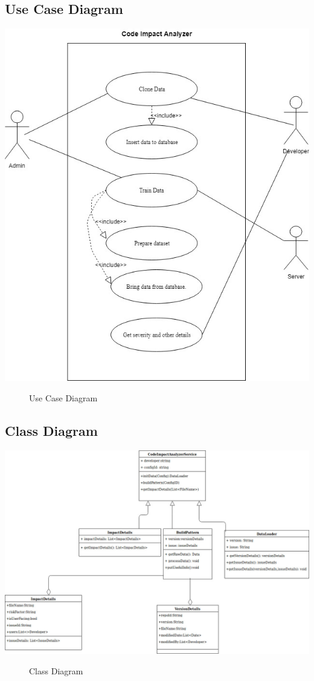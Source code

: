 \documentclass[oneside,a4paper,12pt]{book}
\begin{document}
\subsection{Use Case Diagram}
\vspace*{1\baselineskip}
\includegraphics[width=\textwidth]{use case.jpg}
\begin{figure}[h]
    \caption{Use Case Diagram}
    \label{fig:Use Case Diagram}
\end{figure}

\subsection{Class Diagram}
\vspace*{1\baselineskip}
\includegraphics[width=\textwidth]{class.png}
\begin{figure}[h]
    \caption{Class Diagram}
    \label{fig:Class Diagram}
\end{figure}
\end{document}
